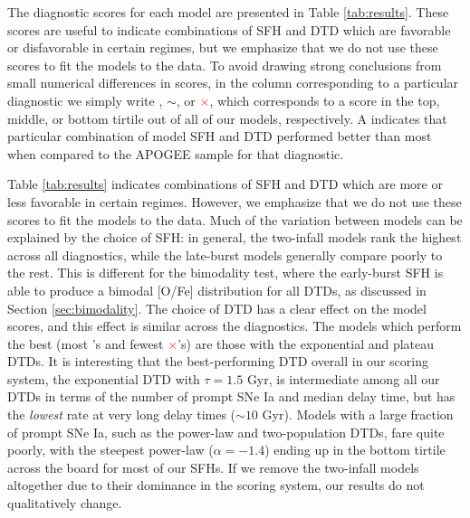 \documentclass[twocolumn,twocolappendix,linenumbers,trackchanges]{aastex631}
\newcommand{\yes}{\textcolor{green}{\checkmark}\xspace}
\newcommand{\meh}{\textcolor{black}{$\sim$}\xspace}
\newcommand{\no}{\textcolor{red}{$\times$}\xspace}
\begin{document}
The diagnostic scores for each model are presented in Table \ref{tab:results}. These scores are useful to indicate combinations of SFH and DTD which are favorable or disfavorable in certain regimes, but we emphasize that we do not use these scores to fit the models to the data.
To avoid drawing strong conclusions from small numerical differences in scores, 
in the column corresponding to a particular diagnostic we simply write \yes, \meh, or \no, which corresponds to a score in the top, middle, or bottom tirtile out of all of our models, respectively. A \yes indicates that particular combination of model SFH and DTD performed better than most when compared to the APOGEE sample for that diagnostic.

Table \ref{tab:results} indicates combinations of SFH and DTD which are more or less favorable in certain regimes. However, we emphasize that we do not use these scores to fit the models to the data. Much of the variation between models can be explained by the choice of SFH: in general, the two-infall models rank the highest across all diagnostics, while the late-burst models generally compare poorly to the rest. This is different for the bimodality test, where the early-burst SFH is able to produce a bimodal [O/Fe] distribution for all DTDs, as discussed in Section \ref{sec:bimodality}. The choice of DTD has a clear effect on the model scores, and this effect is similar across the diagnostics. The models which perform the best (most \yes's and fewest \no's) are those with the exponential and plateau DTDs. It is interesting that the best-performing DTD overall in our scoring system, the exponential DTD with $\tau=1.5$ Gyr, is intermediate among all our DTDs in terms of the number of prompt SNe Ia and median delay time, but has the {\it lowest} rate at very long delay times ($\sim10$ Gyr). Models with a large fraction of prompt SNe Ia, such as the power-law and two-population DTDs, fare quite poorly, with the steepest power-law ($\alpha=-1.4$) ending up in the bottom tirtile across the board for most of our SFHs. If we remove the two-infall models altogether due to their dominance in the scoring system, our results do not qualitatively change.
\end{document}
